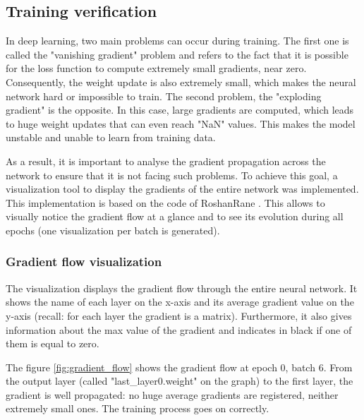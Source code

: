 \subsection{Training verification}
\setlength{\marginparwidth}{3cm}\leavevmode {}In deep learning, two main problems can occur during training. The first one is called the "vanishing gradient" problem and refers to the fact that it is possible for the loss function to compute extremely small gradients, near zero. Consequently, the weight update is also extremely small, which makes the neural network hard or impossible to train. The second problem, the "exploding gradient" is the opposite. In this case, large gradients are computed, which leads to huge weight updates that can even reach "NaN" values. This makes the model unstable and unable to learn from training data.

As a result, it is important to analyse the gradient propagation across the network to ensure that it is not facing such problems. To achieve this goal, a visualization tool to display the gradients of the entire network was implemented. This implementation is based on the code of RoshanRane \cite{47}.  This allows to visually notice the gradient flow at a glance and to see its evolution during all epochs (one visualization per batch is generated).


\subsubsection{Gradient flow visualization}
The visualization displays the gradient flow through the entire neural network. It shows the name of each layer on the x-axis and its average gradient value on the y-axis (recall: for each layer the gradient is a matrix). Furthermore, it also gives information about the max value of the gradient and indicates in black if one of them is equal to zero.

The figure \ref{fig:gradient_flow} shows the gradient flow at epoch 0, batch 6. From the output layer (called "last\_layer0.weight" on the graph) to the first layer, the gradient is well propagated: no huge average gradients are registered, neither extremely small ones. The training process goes on correctly.

